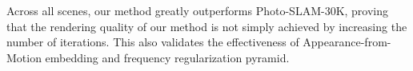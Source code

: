Across all scenes, our method greatly outperforms Photo-SLAM-30K, proving that the rendering quality of our method is not simply achieved by increasing the number of iterations. This also validates the effectiveness of Appearance-from-Motion embedding and frequency regularization pyramid.



